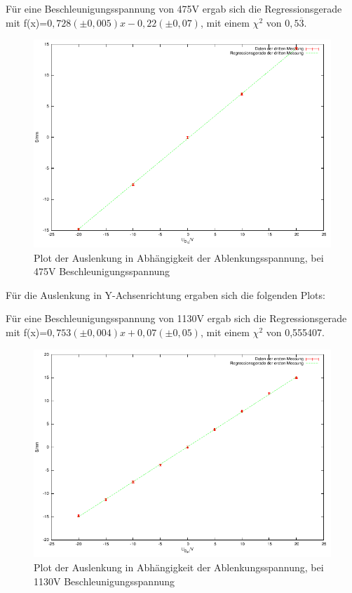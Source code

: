 \documentclass[12pt]{scrartcl}
\begin{document}
\newpage

Für eine Beschleunigungsspannung von 475V ergab sich die Regressionsgerade mit f(x)=$0,728 (\pm 0,005) x - 0,22 (\pm 0,07)$, mit einem $\chi^2$ von $0,5\overline{3}$.

\begin{figure}[htbp] 
  \centering
    \includegraphics[scale = 1]{x_3.pdf}
  	\caption[Plot der Auslenkung in Abhängigkeit der Ablenkungsspannung, bei 475V Beschleunigungsspannung]{Plot der Auslenkung in Abhängigkeit der Ablenkungsspannung, bei 475V Beschleunigungsspannung}
  \label{fig:x_1}
\end{figure}




\newpage

Für die Auslenkung in Y-Achsenrichtung ergaben sich die folgenden Plots:

Für eine Beschleunigungsspannung von 1130V ergab sich die Regressionsgerade mit f(x)=$0,753 (\pm 0,004) x  + 0,07 (\pm 0,05)$, mit einem $\chi^2$ von 0,555407.

\begin{figure}[htbp] 
  \centering
    \includegraphics[scale = 1]{y_1.pdf}
  	\caption[Plot der Auslenkung in Abhängigkeit der Ablenkungsspannung, bei 1130V Beschleunigungsspannung]{Plot der Auslenkung in Abhängigkeit der Ablenkungsspannung, bei 1130V Beschleunigungsspannung}
  \label{fig:x_1}
\end{figure}
\end{document}
